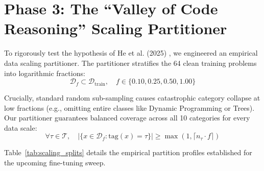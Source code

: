 \documentclass[lettersize,journal]{IEEEtran}
\begin{document}
\section{Phase 3: The ``Valley of Code Reasoning'' Scaling Partitioner}
\label{sec:scaling}
To rigorously test the hypothesis of He et al. (2025) \cite{he2025valley}, we engineered an empirical data scaling partitioner. The partitioner stratifies the 64 clean training problems into logarithmic fractions:
\begin{equation}
\mathcal{D}_{f} \subset \mathcal{D}_\text{train}, \quad f \in \{0.10, 0.25, 0.50, 1.00\}
\end{equation}

Crucially, standard random sub-sampling causes catastrophic category collapse at low fractions (e.g., omitting entire classes like Dynamic Programming or Trees). Our partitioner guarantees balanced coverage across all 10 categories for every data scale:
\begin{equation}
\forall \tau \in \mathcal{T}, \quad \left| \{x \in \mathcal{D}_f : \text{tag}(x) = \tau\} \right| \ge \max\left(1, \lceil n_\tau \cdot f \rceil\right)
\end{equation}

Table~\ref{tab:scaling_splits} details the empirical partition profiles established for the upcoming fine-tuning sweep.

\begin{table}[!t]
\caption{Stratified Data Partitions for Empirical Reasoning Valley Sweep}
\label{tab:scaling_splits}
\centering
{}
\end{table}
\end{document}
